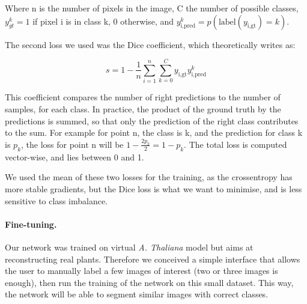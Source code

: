 Where n is the number of pixels in the image, C the number of possible
classes, $y_{gt}^k = 1$ if pixel i is in class k, 0 otherwise, and
$y_ {\textrm{i}, \textrm{pred}}^k = p(\textrm{label}(y_{\textrm{i},
\textrm{gt}}) = k)$.

The second loss we used was the Dice coefficient, which theoretically
writes as:

\begin{equation}
    s = 1 - \frac{1}{n}\sum_{i=1}^n\sum_{k=0}^{C}y_{\textrm{i},
    \textrm{gt}} y_{\textrm{i}, \textrm{pred}}^k
\end{equation}


This coefficient compares the number of right predictions to the
number of samples, for each class. In practice, the product of the
ground truth by the predictions is summed, so that only the prediction
of the right class contributes to the sum. For example for point n,
the class is k, and the prediction for class k is $p_k$, the loss
for point n will be $1 - \frac{2p_k}{2} = 1 - p_k$. The total loss
is computed vector-wise, and lies between 0 and 1.


We used the mean of these two losses for the training, as the
crossentropy has more stable gradients, but the Dice loss is what we
want to minimise, and is less sensitive to class imbalance.


\paragraph{Fine-tuning.} Our network was trained on virtual \emph{A.
Thaliana} model but aims at reconstructing real plants.  Therefore we
conceived a simple interface that allows the user to manually label a
few images of interest (two or three images is enough), then run the training
of the network on this small dataset. This way, the network will be
able to segment similar images with correct classes.

